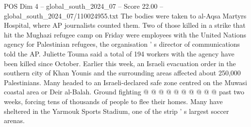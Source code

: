 \begin{textsample}{POS Dim 4 – global\_south\_2024\_07 – Score 22.00 – global\_south\_2024\_07/110024955.txt}
The bodies were taken to al-Aqsa Martyrs Hospital, where AP journalists counted them.
Two of those killed in a strike that hit the Mughazi refugee camp on Friday were employees with the United Nations agency for Palestinian refugees, the organisation ' s director of communications told the AP.
Juliette Touma said a total of 194 workers with the agency have been killed since October.
Earlier this week, an Israeli evacuation order in the southern city of Khan Younis and the surrounding areas affected about 250,000 Palestinians.
Many headed to an Israeli-declared safe zone centred on the Muwasi coastal area or Deir al-Balah.
Ground fighting @ @ @ @ @ @ @ @ @ @ past two weeks, forcing tens of thousands of people to flee their homes.
Many have sheltered in the Yarmouk Sports Stadium, one of the strip ' s largest soccer arenas.

\end{textsample}
